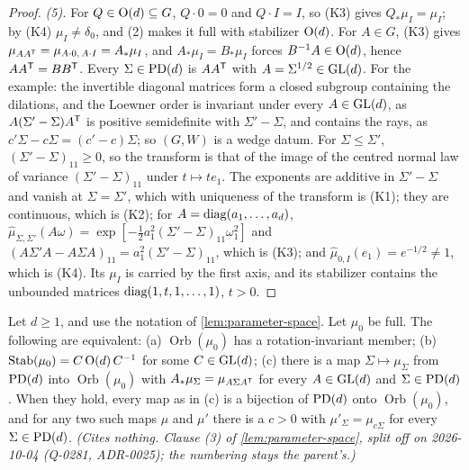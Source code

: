\begin{proof}
\emph{(5).} For $Q \in \mathrm{O}(d) \subseteq G$, $Q \cdot 0 = 0$ and $Q \cdot I = I$, so (K3) gives
$Q_*\mu_I = \mu_I$; by (K4) $\mu_I \ne \delta_0$, and (2) makes it full with stabilizer $\mathrm{O}(d)$.
For $A \in G$, (K3) gives $\mu_{AA^{\mathsf{T}}} = \mu_{A\cdot 0,\,A\cdot I} = A_*\mu_I$, and
$A_*\mu_I = B_*\mu_I$ forces $B^{-1}A \in \mathrm{O}(d)$, hence $AA^{\mathsf{T}} = BB^{\mathsf{T}}$. Every
$\Sigma \in \mathrm{PD}(d)$ is $AA^{\mathsf{T}}$ with $A = \Sigma^{1/2} \in \mathrm{GL}(d)$. For the example: the
invertible diagonal matrices form a closed subgroup containing the dilations, and the Loewner order is
invariant under every $A \in \mathrm{GL}(d)$, as $A(\Sigma' - \Sigma)A^{\mathsf{T}}$ is positive semidefinite with
$\Sigma' - \Sigma$, and contains the rays, as $c'\Sigma - c\Sigma = (c' - c)\Sigma$; so
$(G, W)$ is a wedge datum. For $\Sigma \le \Sigma'$, $(\Sigma' - \Sigma)_{11} \ge 0$, so the
transform is that of the image of the centred normal law of variance $(\Sigma' - \Sigma)_{11}$ under
$t \mapsto te_1$. The exponents are additive in $\Sigma' - \Sigma$ and vanish at $\Sigma = \Sigma'$,
which with uniqueness of the transform is (K1); they are continuous, which is (K2); for
$A = \operatorname{diag}(a_1,\dots,a_d)$, $\widehat\mu_{\Sigma,\Sigma'}(A\omega) = \exp[-\tfrac12a_1^2(\Sigma' -
\Sigma)_{11}\omega_1^2]$ and $(A\Sigma'A - A\Sigma A)_{11} = a_1^2(\Sigma' - \Sigma)_{11}$, which is (K3);
and $\widehat\mu_{0,I}(e_1) = e^{-1/2} \ne 1$, which is (K4). Its $\mu_I$ is carried by the first
axis, and its stabilizer contains the unbounded matrices $\operatorname{diag}(1, t, 1, \dots, 1)$, $t > 0$.
\end{proof}

\begin{lemma}
\label{lem:parameter-space-indexing}
\leanok
Let $d \ge 1$, and use the notation of \ref{lem:parameter-space}. Let $\mu_0$ be full. The
following are equivalent:
(a) $\operatorname{Orb}(\mu_0)$ has a rotation-invariant member;
(b) $\operatorname{Stab}(\mu_0) = C\,\mathrm{O}(d)\,C^{-1}$ for some $C \in \mathrm{GL}(d)$;
(c) there is a map $\Sigma \mapsto \mu_\Sigma$ from $\mathrm{PD}(d)$ into $\operatorname{Orb}(\mu_0)$ with
$A_*\mu_\Sigma = \mu_{A\Sigma A^{\mathsf{T}}}$ for every $A \in \mathrm{GL}(d)$ and $\Sigma \in \mathrm{PD}(d)$.
When they hold, every map as in (c) is a bijection of $\mathrm{PD}(d)$ onto $\operatorname{Orb}(\mu_0)$, and
for any two such maps $\mu$ and $\mu'$ there is a $c > 0$ with $\mu'_\Sigma = \mu_{c\Sigma}$ for
every $\Sigma \in \mathrm{PD}(d)$.
\statusT\quad\emph{(Cites nothing. Clause (3) of \ref{lem:parameter-space}, split off on 2026-10-04
(Q-0281, ADR-0025); the numbering stays the parent's.)}
\end{lemma}

